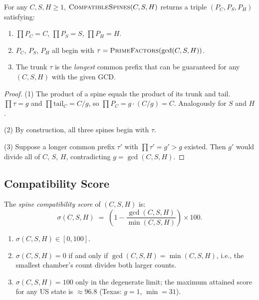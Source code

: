 \begin{proposition}[Correctness]
\label{prop:correct}
For any $C, S, H \geq 1$, $\textsc{CompatibleSpines}(C, S, H)$ returns
a triple $(P_C, P_S, P_H)$ satisfying:
\begin{enumerate}
  \item $\prod P_C = C$, $\prod P_S = S$, $\prod P_H = H$.
  \item $P_C$, $P_S$, $P_H$ all begin with $\tau = \textsc{PrimeFactors}(\gcd(C,S,H))$.
  \item The trunk $\tau$ is the \emph{longest} common prefix that can be
        guaranteed for any $(C, S, H)$ with the given GCD.
\end{enumerate}
\end{proposition}

\begin{proof}
(1) The product of a spine equals the product of its trunk and tail.
$\prod \tau = g$ and $\prod \text{tail}_C = C/g$, so $\prod P_C = g \cdot (C/g) = C$.
Analogously for $S$ and $H$.

(2) By construction, all three spines begin with $\tau$.

(3) Suppose a longer common prefix $\tau'$ with $\prod \tau' = g' > g$ existed.
Then $g'$ would divide all of $C$, $S$, $H$, contradicting $g = \gcd(C,S,H)$.
\end{proof}

\subsection{Compatibility Score}

\begin{definition}
\label{def:score}
The \emph{spine compatibility score} of $(C, S, H)$ is:
\begin{equation}
  \sigma(C, S, H) \;=\; \left(1 - \frac{\gcd(C,S,H)}{\min(C,S,H)}\right) \times 100.
\end{equation}
\end{definition}

\begin{lemma}
\label{lem:score}
\begin{enumerate}
  \item $\sigma(C, S, H) \in [0, 100]$.
  \item $\sigma(C, S, H) = 0$ if and only if $\gcd(C,S,H) = \min(C,S,H)$, i.e.,
        the smallest chamber's count divides both larger counts.
  \item $\sigma(C, S, H) = 100$ only in the degenerate limit; the maximum
        attained score for any US state is $\approx 96.8$ (Texas: $g=1$,
        $\min = 31$).
\end{enumerate}
\end{lemma}

